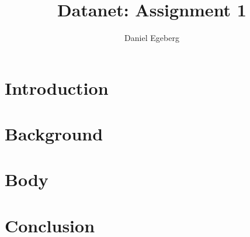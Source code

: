 \documentclass{../sig-alternate}
\begin{document}
\title{Datanet: Assignment 1}


\author{
\alignauthor
    Daniel Egeberg\\
}

\maketitle

\begin{abstract}

%
%
\lipsum[1]

\end{abstract}

%
%
\section{Introduction}
\lipsum
\section{Background}
\lipsum[6-9]
\section{Body}
\lipsum[10-14]
\section{Conclusion}
\lipsum[23-24]
%
%


%

\end{document}
